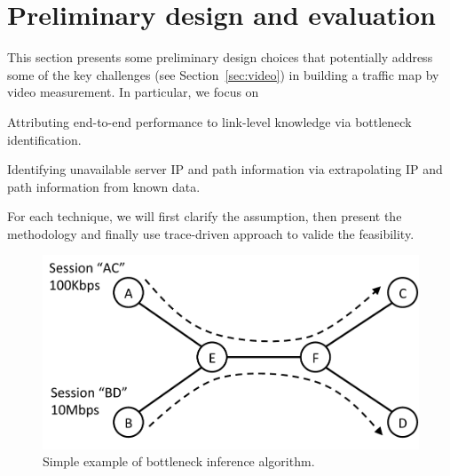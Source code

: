 \section{Preliminary design and evaluation}

This section presents some preliminary design choices that potentially address some of the key challenges (see Section~\ref{sec:video}) in building a traffic map by video measurement. In particular, we focus on

\begin{packeditemize}
	\item Attributing end-to-end performance to link-level knowledge via bottleneck identification.
	\item Identifying unavailable server IP and path information via extrapolating IP and path information from known data.
\end{packeditemize}

For each technique, we will first clarify the assumption, then present the methodology and finally use trace-driven approach to valide the feasibility.

\begin{figure}[h]
\begin{center}
\includegraphics[scale=0.4] {figures/bottleneckExample.pdf}
\caption{Simple example of bottleneck inference algorithm.}
\label{fig:idea:example}
\end{center}
\end{figure}

